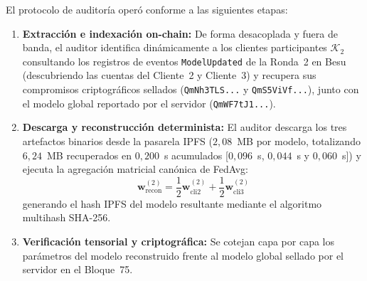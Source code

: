 \begin{table}[H]
\centering
\caption{Cadena de custodia y trazabilidad cruzada on-chain/IPFS durante la Ronda 2 y su fiscalización ex-post.}
\label{tab:trazabilidad_ronda2}
\end{table}

El protocolo de auditoría operó conforme a las siguientes etapas:
\begin{enumerate}
    \item \textbf{Extracción e indexación on-chain:} De forma desacoplada y fuera de banda, el auditor identifica dinámicamente a los clientes participantes $\mathcal{K}_2$ consultando los registros de eventos \texttt{ModelUpdated} de la Ronda~2 en Besu (descubriendo las cuentas del Cliente~2 y Cliente~3) y recupera sus compromisos criptográficos sellados (\texttt{QmNh3TLS...} y \texttt{QmS5ViVf...}), junto con el modelo global reportado por el servidor (\texttt{QmWF7tJ1...}).
    \item \textbf{Descarga y reconstrucción determinista:} El auditor descarga los tres artefactos binarios desde la pasarela IPFS ($2{,}08$~MB por modelo, totalizando $6{,}24$~MB recuperados en $0{,}200$~s acumulados [$0{,}096$~s, $0{,}044$~s y $0{,}060$~s]) y ejecuta la agregación matricial canónica de FedAvg:
    \begin{equation}
    \mathbf{w}_{\text{recon}}^{(2)} = \frac{1}{2}\mathbf{w}_{\text{cli2}}^{(2)} + \frac{1}{2}\mathbf{w}_{\text{cli3}}^{(2)}
    \end{equation}
    generando el hash IPFS del modelo resultante mediante el algoritmo multihash SHA-256.
    \item \textbf{Verificación tensorial y criptográfica:} Se cotejan capa por capa los parámetros del modelo reconstruido frente al modelo global sellado por el servidor en el Bloque~75.
\end{enumerate}

